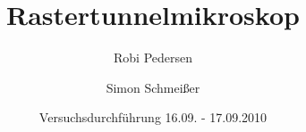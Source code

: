 \documentclass[a4paper,oneside]{scrartcl} %
\title{Rastertunnelmikroskop}
\author{Robi Pedersen \and Simon Schmeißer}
\date{Versuchsdurchführung 16.09. - 17.09.2010}
\begin{document}
\begin{titlepage}
  \maketitle
  \vfill
  \thispagestyle{empty}
\end{titlepage}

\tableofcontents
\clearpage







%

\clearpage

% 
%
\end{document}
